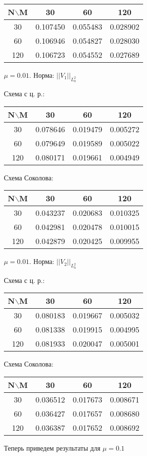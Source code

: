 \documentclass[specialist,subf,href,colorlinks=true,14pt,times,mtpro]{disser}
\begin{document}
\begin{tabular}{|c|c|c|c|}
    \hline
    N$\backslash$M & 30 & 60 & 120 \\
    \hline
    30 & 0.107450 & 0.055483 & 0.028902 \\
    \hline
    60 & 0.106946 & 0.054827 & 0.028030 \\
    \hline
    120 & 0.106723 & 0.054552 & 0.027689 \\
    \hline
\end{tabular}
\BlankLine
\BlankLine
\BlankLine
$\mu = 0.01.$ Норма:  $||V_1||_{L^2_h}$

Схема с ц. р.:

\begin{tabular}{|c|c|c|c|}
    \hline
    N$\backslash$M & 30 & 60 & 120 \\
    \hline
    30 & 0.078646 & 0.019479 & 0.005272 \\
    \hline
    60 & 0.079649 & 0.019589 & 0.005022 \\
    \hline
    120 & 0.080171 & 0.019661 & 0.004949 \\
    \hline
\end{tabular}
\BlankLine
Схема Соколова:

\begin{tabular}{|c|c|c|c|}
    \hline
    N$\backslash$M & 30 & 60 & 120 \\
    \hline
    30 & 0.043237 & 0.020683 & 0.010325 \\
    \hline
    60 & 0.042981 & 0.020478 & 0.010015 \\
    \hline
    120 & 0.042879 & 0.020425 & 0.009955 \\
    \hline
\end{tabular}
\BlankLine
\BlankLine
\BlankLine

$\mu = 0.01.$ Норма:  $||V_2||_{L^2_h}$

Схема с ц. р.:

\begin{tabular}{|c|c|c|c|}
    \hline
    N$\backslash$M & 30 & 60 & 120 \\
    \hline
    30 & 0.080183 & 0.019667 & 0.005032 \\
    \hline
    60 & 0.081338 & 0.019915 & 0.004995 \\
    \hline
    120 & 0.081933 & 0.020047 & 0.005001 \\
    \hline
\end{tabular}
\BlankLine
Схема Соколова:

\begin{tabular}{|c|c|c|c|}
    \hline
    N$\backslash$M & 30 & 60 & 120 \\
    \hline
    30 & 0.036512 & 0.017673 & 0.008671 \\
    \hline
    60 & 0.036427 & 0.017657 & 0.008680 \\
    \hline
    120 & 0.036387 & 0.017652 & 0.008692 \\
    \hline
\end{tabular}
\BlankLine
\BlankLine
\BlankLine
Теперь приведем результаты для $\mu = 0.1$
\end{document}
